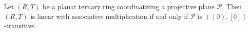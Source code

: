 Let $(R, T)$ be a planar ternary ring coordinatizing a projective plane $\mathcal{P}$. Then $(R, T)$ is linear with associative multiplication if and only if $\mathcal{P}$ is $((0), [0])$-transitive.
